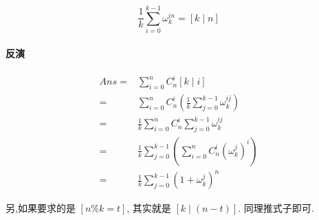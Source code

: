 \begin{footnotesize}
\begin{minipage}[t]{0.42\linewidth}
$$\frac{1}{k} \sum_{i=0}^{k-1} \omega_{k}^{in} = [k \mid n]$$

\paragraph*{反演}

$$\begin{aligned}
Ans =& \sum_{i=0}^n{C_n^i [k \mid i]} \\
=& \sum_{i=0}^n{C_n^i(\frac{1}{k}\sum_{j=0}^{k-1}{\omega_k^{ij}})} \\
=& \frac{1}{k} {\sum_{i=0}^{n}C_n^i \sum_{j=0}^{k-1} \omega_k^{ij}} \\
=& \frac{1}{k} {\sum_{j=0}^{k-1}(\sum_{i=0}^n C_n^i(\omega_k^j)^i)} \\
=& \frac{1}{k} \sum_{j=0}^{k-1} (1+\omega_k^j)^n
\end{aligned}$$

另,如果要求的是 $\left[n \% k = t\right]$, 其实就是 $\left[k \mid (n-t)\right]$. 同理推式子即可.
\end{minipage}


\end{footnotesize}
